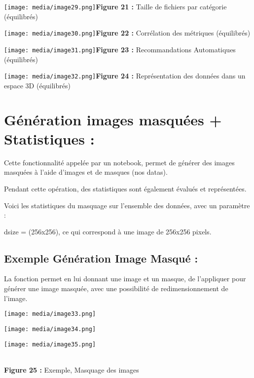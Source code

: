 \texttt{[image: media/image29.png]}\textbf{Figure
21 :} Taille de fichiers par catégorie (équilibrés)

\texttt{[image: media/image30.png]}\textbf{Figure
22 :} Corrélation des métriques (équilibrés)

\texttt{[image: media/image31.png]}\textbf{Figure
23 :} Recommandations Automatiques (équilibrés)

\texttt{[image: media/image32.png]}\textbf{Figure
24 :} Représentation des données dans un espace 3D (équilibrés)

\section[Génération images masquées + Statistiques :
]{\texorpdfstring{\protect\hypertarget{anchor-42}{}{}\protect\hypertarget{anchor-43}{}{}\protect\hypertarget{anchor-44}{}{}Génération
images masquées + Statistiques :
}{Génération images masquées + Statistiques : }}\label{guxe9nuxe9ration-images-masquuxe9es-statistiques}

Cette fonctionnalité appelée par un notebook, permet de générer des
images masquées à l'aide d'images et de masques (nos datas).

Pendant cette opération, des statistiques sont également évalués et
représentées.

Voici les statistiques du masquage sur l'ensemble des données, avec un
paramètre :

dsize = (256x256), ce qui correspond à une image de 256x256 pixels.

\subsection[Exemple Génération Image Masqué :
]{\texorpdfstring{\protect\hypertarget{anchor-45}{}{}Exemple Génération
Image Masqué :
}{Exemple Génération Image Masqué : }}\label{exemple-guxe9nuxe9ration-image-masquuxe9}

La fonction permet en lui donnant une image et un masque, de l'appliquer
pour générer une image masquée, avec une possibilité de
redimensionnement de l'image.

\texttt{[image: media/image33.png]}

\texttt{[image: media/image34.png]}

\texttt{[image: media/image35.png]}\\
\strut \\
\textbf{Figure 25 :} Exemple, Masquage des images

